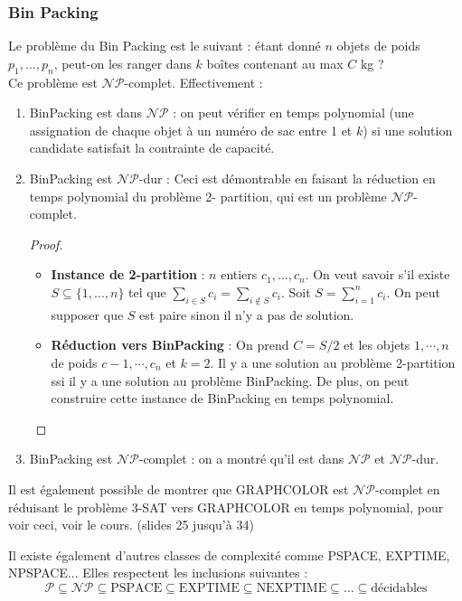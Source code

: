 \subsubsection{Bin Packing}
\label{sub:bin_packing}
Le problème du Bin Packing est le suivant : étant donné $n$ objets de poids $p_1,...,p_n$, peut-on les ranger dans $k$ boîtes
contenant au max $C$ kg ?\\

Ce problème est $\mathcal{NP}$-complet. Effectivement :
\begin{enumerate}
    \item BinPacking est dans $\mathcal{NP}$ : on peut vérifier en temps polynomial (une assignation de chaque objet à un numéro
    de sac entre 1 et $k$) si une solution candidate satisfait la contrainte de capacité.
    \item BinPacking est $\mathcal{NP}$-dur : Ceci est démontrable en faisant la réduction en temps polynomial du problème 2-
    partition, qui est un problème $\mathcal{NP}$-complet.
    \begin{proof}
        \begin{itemize}[label=$\rightarrow$]
            \item \textbf{Instance de 2-partition} : $n$ entiers $c_1,...,c_n$. On veut savoir s'il existe $S\subseteq\{1,...,n\}$
            tel que $\sum_{i\in S}c_i = \sum_{i\notin S}c_i$. Soit $S = \sum_{i=1}^{n}c_i$. On peut supposer que $S$ est paire sinon
            il n'y a pas de solution.
            \item \textbf{Réduction vers BinPacking} : On prend $C = S/2$ et les objets $1,\cdots,n$ de poids $c-1,\cdots,c_n$ et 
            $k=2$. Il y a une solution au problème 2-partition ssi il y a une solution au problème BinPacking. De plus, on peut 
            construire cette instance de BinPacking en temps polynomial. 
        \end{itemize}
    \end{proof}
    \item BinPacking est $\mathcal{NP}$-complet : on a montré qu'il est dans $\mathcal{NP}$ et $\mathcal{NP}$-dur.
\end{enumerate}
Il est également possible de montrer que GRAPHCOLOR est $\mathcal{NP}$-complet en réduisant le problème 3-SAT vers GRAPHCOLOR
en temps polynomial, pour voir ceci, voir le cours. (slides 25 jusqu'à 34)\\
\begin{remark}
    Il existe également d'autres classes de complexité comme PSPACE, EXPTIME, NPSPACE...
    Elles respectent les inclusions suivantes :
    \begin{equation*}
        \mathcal{P}\subseteq\mathcal{NP}\subseteq\text{PSPACE}\subseteq\text{EXPTIME}\subseteq\text{NEXPTIME}\subseteq\dots
        \subseteq \text{décidables}
    \end{equation*}
\end{remark}


